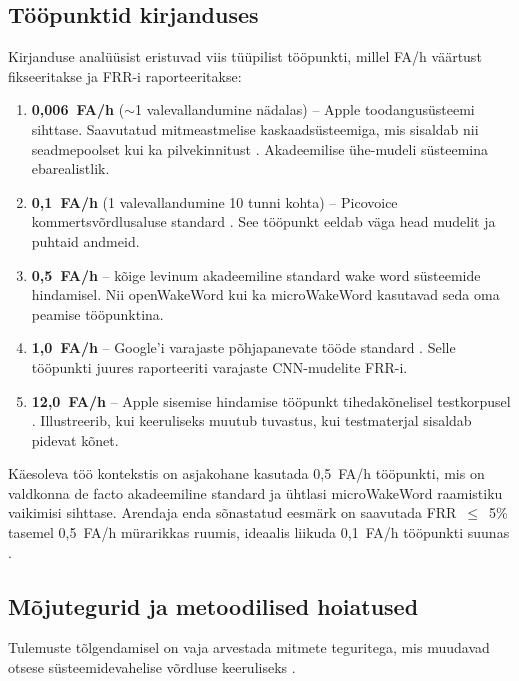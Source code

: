 \subsection{Tööpunktid kirjanduses}\label{subsec:operating-points}

Kirjanduse analüüsist eristuvad viis tüüpilist tööpunkti, millel FA/h väärtust fikseeritakse ja FRR-i raporteeritakse:

\begin{enumerate}
    \item \textbf{0,006~FA/h} ($\sim$1 valevallandumine nädalas) -- Apple toodangusüsteemi sihttase. Saavutatud mitmeastmelise kaskaadsüsteemiga, mis sisaldab nii seadmepoolset kui ka pilvekinnitust \cite{apple-heysiri2017}. Akadeemilise ühe-mudeli süsteemina ebarealistlik.
    \item \textbf{0,1~FA/h} (1 valevallandumine 10 tunni kohta) -- Picovoice kommertsvõrdlusaluse standard \cite{picovoice-benchmark2026}. See tööpunkt eeldab väga head mudelit ja puhtaid andmeid.
    \item \textbf{0,5~FA/h} -- kõige levinum akadeemiline standard wake word süsteemide hindamisel. Nii openWakeWord \cite{openwakeword2026} kui ka microWakeWord \cite{microwakeword2026} kasutavad seda oma peamise tööpunktina.
    \item \textbf{1,0~FA/h} -- Google'i varajaste põhjapanevate tööde standard \cite{sainath2015cnn,chen2014smallfootprint}. Selle tööpunkti juures raporteeriti varajaste CNN-mudelite FRR-i.
    \item \textbf{12,0~FA/h} -- Apple sisemise hindamise tööpunkt tihedakõnelisel testkorpusel \cite{kundu2023heimdal}. Illustreerib, kui keeruliseks muutub tuvastus, kui testmaterjal sisaldab pidevat kõnet.
\end{enumerate}

Käesoleva töö kontekstis on asjakohane kasutada 0,5~FA/h tööpunkti, mis on valdkonna de facto akadeemiline standard ja ühtlasi microWakeWord raamistiku vaikimisi sihttase. Arendaja enda sõnastatud eesmärk on saavutada FRR~$\leq$~5\% tasemel 0,5~FA/h mürarikkas ruumis, ideaalis liikuda 0,1~FA/h tööpunkti suunas \cite{microwakeword2026}.

\subsection{Mõjutegurid ja metoodilised hoiatused}\label{subsec:caveats}

Tulemuste tõlgendamisel on vaja arvestada mitmete teguritega, mis muudavad otsese süsteemidevahelise võrdluse keeruliseks \cite{ahmed2022robustkws,lopezespejo2021deepkws}.

